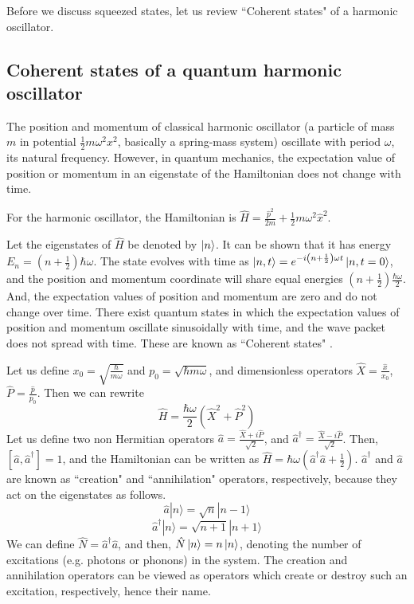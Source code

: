 \documentclass[12pt, twoside]{article}
\begin{document}
Before we discuss squeezed states, let us review ``Coherent states" of a harmonic oscillator.
\subsection{Coherent states of a quantum harmonic oscillator}
The position and momentum of classical harmonic oscillator (a particle of mass $m$ in potential $\frac{1}{2}m\omega^2x^2$, basically a spring-mass system) oscillate with period $\omega$, its natural frequency.
However, in quantum mechanics, the expectation value of position or momentum in an eigenstate of the Hamiltonian does not change with time.

For the harmonic oscillator, the Hamiltonian is $\hat{H} = \frac{\hat{p}^2}{2m} + \frac{1}{2}m \omega^2 {\hat{x}}^2$.

Let the eigenstates of $\hat{H}$ be denoted by $\ket{n}$. It can be shown \cite{cohen_tannoudji} that it has energy $E_n = (n+\frac{1}{2}) \hbar\omega$. The state evolves with time as $\ket{n,t} = e ^ { -i \left( n + \frac { 1 } { 2 } \right) \omega t } \ket{n,t=0}$, and the position and momentum coordinate will share equal energies $(n+\frac{1}{2}) \frac{\hbar\omega}{2}$. And, the expectation values of position and momentum are zero and do not change over time.
There exist quantum states in which the expectation values of position and momentum oscillate sinusoidally with time, and the wave packet does not spread with time. These are known as ``Coherent states" \cite{wikipedia_coherent}.


Let us define $x_0 = \sqrt{\frac{\hbar}{m\omega}}$ and $p_0 = \sqrt{\hbar m \omega}$, and dimensionless operators $\hat{X} = \frac{\hat{x}}{x_0}$,$\hat{P} = \frac{\hat{p}}{p_0}$. Then we can rewrite \begin{equation}\label{eq:Hamiltonian}\hat{H} = \frac{\hbar\omega}{2}({\hat{X}}^2 + {\hat{P}}^2)\end{equation}
Let us define two non Hermitian operators $\hat{a} = \frac{\hat{X} + i \hat{P}}{\sqrt{2}}$, and ${\hat{a}}^\dagger = \frac{\hat{X} - i \hat{P}}{\sqrt{2}}$. Then, $[\hat{a},\hat{a}^\dagger] = 1$, and the Hamiltonian can be written as $\hat{H} = \hbar\omega( \hat{a}^\dagger \hat{a} + \frac{1}{2})$.
$\hat{a}^\dagger$ and $\hat{a}$ are known as ``creation" and ``annihilation" operators, respectively, because they act on the eigenstates as follows. 
\begin{equation}\label{eq:a} { \hat{a} | n \rangle = \sqrt { n } | n - 1 \rangle } \end{equation}
\begin{equation} \label{eq:adagger}{ \hat{a} ^ { \dagger } | n \rangle = \sqrt { n + 1 } | n + 1 \rangle }\end{equation} 
We can define $\hat{N} = \hat{a}^\dagger\hat{a}$, and then, $\hat{N} \ket{n} = n\ket{n}$, denoting the number of excitations (e.g. photons or phonons) in the system. The creation and annihilation operators can be viewed as operators which create or destroy such an excitation, respectively, hence their name.
\end{document}
